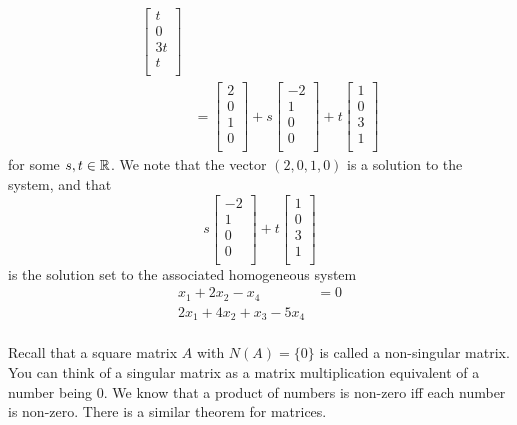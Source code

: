\documentclass{article}
\begin{document}
\begin{example}
\begin{align*}
    \begin{bmatrix}
      t\\
      0\\
      3t\\
      t\\
    \end{bmatrix}\\
    &=
    \begin{bmatrix}
      2\\
      0\\
      1\\
      0\\
    \end{bmatrix} + s
    \begin{bmatrix}
      -2\\
      1\\
      0\\
      0\\
    \end{bmatrix} + t
    \begin{bmatrix}
      1\\
      0\\
      3\\
      1\\
    \end{bmatrix}
  \end{align*}
  for some $s, t \in \mathbb{R}$. We note that the vector $(2, 0, 1, 0)$ is a solution to the system, and that \[
    s
    \begin{bmatrix}
      -2\\
      1\\
      0\\
      0\\
    \end{bmatrix} + t
    \begin{bmatrix}
      1\\
      0\\
      3\\
      1\\
  \end{bmatrix}\] is the solution set to the associated homogeneous system
  \begin{align*}
    x_1 + 2x_2 - x_4 &= 0\\
    2x_1 + 4x_2 + x_3 - 5x_4\\
  \end{align*}
\end{example}
\begin{remark}
  Recall that a square matrix $A$ with $N(A) = \{0\}$ is called a non-singular matrix. You can think of a singular matrix as a matrix multiplication equivalent of a number being $0$. We know that a product of numbers is non-zero iff each number is non-zero. There is a similar theorem for matrices.
\end{remark}
\end{document}
